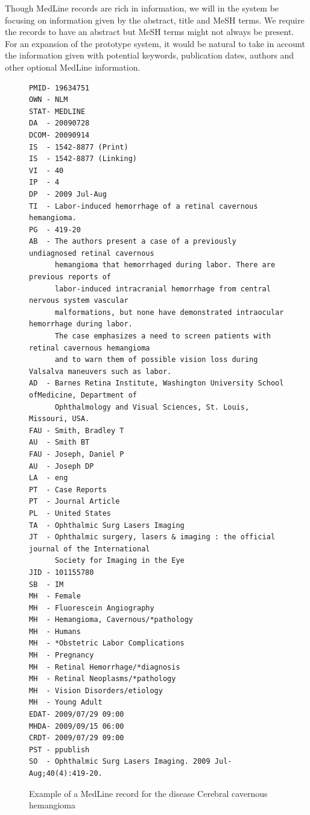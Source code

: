 Though MedLine records are rich in information, we will in the system
be focusing on information given by the abstract, title and MeSH
terms. We require the records to have an abstract but MeSH terms might
not always be present. For an expansion of the prototype system, it
would be natural to take in account the information given with
potential keywords, publication dates, authors and other optional
MedLine information. 


\begin{figure}[H]
  \caption{Example of a MedLine record for the disease Cerebral cavernous hemangioma}
  \scriptsize{
  \begin{verbatim}
PMID- 19634751
OWN - NLM
STAT- MEDLINE
DA  - 20090728
DCOM- 20090914
IS  - 1542-8877 (Print)
IS  - 1542-8877 (Linking)
VI  - 40
IP  - 4
DP  - 2009 Jul-Aug
TI  - Labor-induced hemorrhage of a retinal cavernous hemangioma.
PG  - 419-20
AB  - The authors present a case of a previously undiagnosed retinal cavernous
      hemangioma that hemorrhaged during labor. There are previous reports of
      labor-induced intracranial hemorrhage from central nervous system vascular
      malformations, but none have demonstrated intraocular hemorrhage during labor.
      The case emphasizes a need to screen patients with retinal cavernous hemangioma
      and to warn them of possible vision loss during Valsalva maneuvers such as labor.
AD  - Barnes Retina Institute, Washington University School ofMedicine, Department of
      Ophthalmology and Visual Sciences, St. Louis, Missouri, USA.
FAU - Smith, Bradley T
AU  - Smith BT
FAU - Joseph, Daniel P
AU  - Joseph DP
LA  - eng
PT  - Case Reports
PT  - Journal Article
PL  - United States
TA  - Ophthalmic Surg Lasers Imaging
JT  - Ophthalmic surgery, lasers & imaging : the official journal of the International 
      Society for Imaging in the Eye
JID - 101155780
SB  - IM
MH  - Female
MH  - Fluorescein Angiography
MH  - Hemangioma, Cavernous/*pathology
MH  - Humans
MH  - *Obstetric Labor Complications
MH  - Pregnancy
MH  - Retinal Hemorrhage/*diagnosis
MH  - Retinal Neoplasms/*pathology
MH  - Vision Disorders/etiology
MH  - Young Adult
EDAT- 2009/07/29 09:00
MHDA- 2009/09/15 06:00
CRDT- 2009/07/29 09:00
PST - ppublish
SO  - Ophthalmic Surg Lasers Imaging. 2009 Jul-Aug;40(4):419-20.

  \end{verbatim}
  }
  \label{MedLineRecord}
\end{figure}


